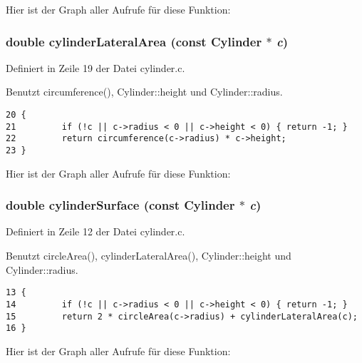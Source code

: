 Hier ist der Graph aller Aufrufe f\"{u}r diese Funktion:
\subsubsection{\setlength{\rightskip}{0pt plus 5cm}double cylinder\-Lateral\-Area (const {\bf Cylinder} $\ast$ {\em c})}\label{cylinder_8c_bea49511e550ad0db24bf68ce91418ff}




Definiert in Zeile 19 der Datei cylinder.c.

Benutzt circumference(), Cylinder::height und Cylinder::radius.

\footnotesize\begin{verbatim}20 {
21         if (!c || c->radius < 0 || c->height < 0) { return -1; }
22         return circumference(c->radius) * c->height;
23 }
\end{verbatim}\normalsize 




Hier ist der Graph aller Aufrufe f\"{u}r diese Funktion:
\subsubsection{\setlength{\rightskip}{0pt plus 5cm}double cylinder\-Surface (const {\bf Cylinder} $\ast$ {\em c})}\label{cylinder_8c_064d77300d0537b11e9d104340f2f959}




Definiert in Zeile 12 der Datei cylinder.c.

Benutzt circle\-Area(), cylinder\-Lateral\-Area(), Cylinder::height und Cylinder::radius.

\footnotesize\begin{verbatim}13 {
14         if (!c || c->radius < 0 || c->height < 0) { return -1; }
15         return 2 * circleArea(c->radius) + cylinderLateralArea(c);
16 }
\end{verbatim}\normalsize 




Hier ist der Graph aller Aufrufe f\"{u}r diese Funktion: